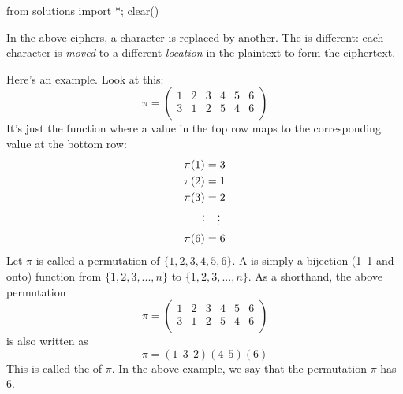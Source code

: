 \begin{python0}
from solutions import *; clear()
\end{python0}

In the above ciphers, a character is replaced by another.
The
is different:
each character is \textit{moved} to a different
\textit{location} in the plaintext
to form the ciphertext.

Here's an example.
Look at this:
\[
  \pi =
  \begin{pmatrix}
    1 & 2 & 3 & 4 & 5 & 6 \\
    3 & 1 & 2 & 5 & 4 & 6 \\
  \end{pmatrix}
  \]
  It's just the function where a value in the top row maps to the
  corresponding value at the bottom row: 
  \begin{align*}
    \pi(1) &= 3 \\
    \pi(2) &= 1 \\
    \pi(3) &= 2 \\
    \vdots &\textwhite{=} \ \vdots \\
    \pi(6) &= 6 \\
  \end{align*}
Let $\pi$ is called a
permutation
of $\{1,2,3,4,5,6\}$.
A
is simply a bijection (1--1 and onto) function
from
$\{1, 2, 3, ..., n\}$
to
$\{1, 2, 3, ..., n\}$.
As a shorthand, the above permutation
\[
  \pi =
  \begin{pmatrix}
    1 & 2 & 3 & 4 & 5 & 6 \\
    3 & 1 & 2 & 5 & 4 & 6 \\
  \end{pmatrix}
\]
is also written as
\[
  \pi = (1 \ \ 3 \ \ 2)(4 \ \ 5)(6)
\]
This is called the
of $\pi$.
In the above example, we say that the permutation $\pi$ has
6.



